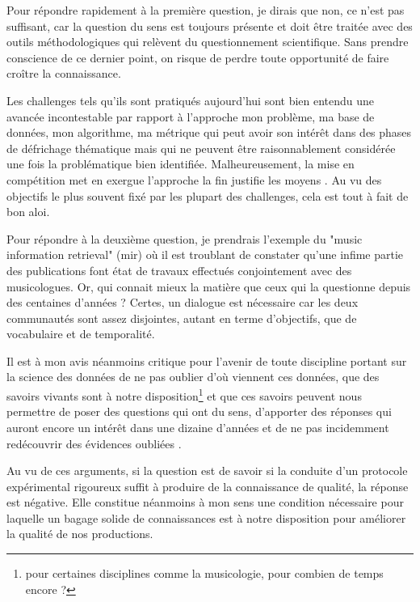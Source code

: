 Pour répondre rapidement à la première question, je dirais que non, ce n'est pas suffisant, car la question du sens est toujours présente et doit être traitée avec des outils méthodologiques qui relèvent du questionnement scientifique. Sans prendre conscience de ce dernier point, on risque de perdre toute opportunité de faire croître la connaissance.

Les challenges tels qu'ils sont pratiqués aujourd'hui sont bien entendu une avancée incontestable par rapport à l'approche \og mon problème, ma base de données, mon algorithme, ma métrique \fg qui peut avoir son intérêt dans des phases de défrichage thématique mais qui ne peuvent être raisonnablement considérée une fois la problématique bien identifiée. Malheureusement, la mise en compétition met en exergue l'approche \og la fin justifie les moyens \fg. Au vu des objectifs le plus souvent fixé par les plupart des challenges, cela est tout à fait de bon aloi.

Pour répondre à la deuxième question, je prendrais l'exemple du "music information retrieval" (mir) où il est troublant de constater qu'une infime partie des publications font état de travaux effectués conjointement avec des musicologues. Or, qui connait mieux la matière que ceux qui la questionne depuis des centaines d'années ? Certes, un dialogue est nécessaire car les deux communautés sont assez disjointes, autant en terme d'objectifs, que de vocabulaire et de temporalité.

Il est à mon avis néanmoins critique pour l'avenir de toute discipline portant sur la science des données de ne pas oublier d'où viennent ces données, que des savoirs vivants sont à notre disposition\footnote{pour certaines disciplines comme la musicologie, pour combien de temps encore ?} et que ces savoirs peuvent nous permettre de poser des questions qui ont du sens, d'apporter des réponses qui auront encore un intérêt dans une dizaine d'années et de ne pas incidemment redécouvrir des évidences \og oubliées \fg.

Au vu de ces arguments, si la question est de savoir si la conduite d'un protocole expérimental rigoureux suffit à produire de la connaissance de qualité, la réponse est négative. Elle constitue néanmoins à mon sens une condition nécessaire pour laquelle un bagage solide de connaissances est à notre disposition pour améliorer la qualité de nos productions.

